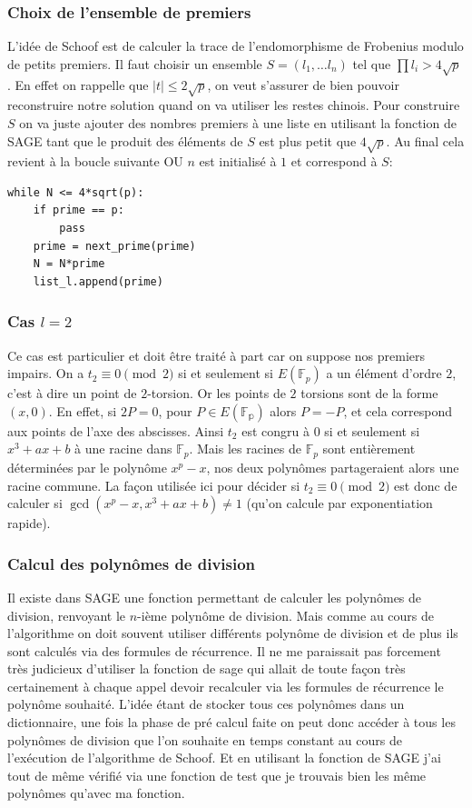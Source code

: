\documentclass[12pt]{article}
\begin{document}
\subsubsection{Choix de l'ensemble de premiers}
L'idée de Schoof est de calculer la trace de l'endomorphisme de Frobenius modulo de petits premiers. Il faut choisir un ensemble $S = (l_1, \ldots l_n)$ tel que $\prod l_i > 4\sqrt{p}$. En effet on rappelle que  $|t| \leq 2 \sqrt{p}$, on veut s'assurer de bien pouvoir reconstruire notre solution quand on va utiliser les restes chinois. Pour construire $S$ on va juste ajouter des nombres premiers à une liste en utilisant la fonction  de SAGE tant que le produit des éléments de $S$ est plus petit que $ 4\sqrt{p}$. Au final cela revient à la boucle suivante OU $n$ est initialisé à $1$ et  correspond à $S$:
\bigskip

\begin{lstlisting}
while N <= 4*sqrt(p):
	if prime == p:
		pass
	prime = next_prime(prime)
	N = N*prime
	list_l.append(prime)
\end{lstlisting}


\subsubsection{Cas $l=2$}
Ce cas est particulier et doit être traité à part car on suppose nos premiers impairs. On a $t_2 \equiv 0 \pmod 2$ si et seulement si $E(\mathbb{F}_p)$ a un élément d'ordre $2$, c'est à dire un point de $2$-torsion. Or les points de $2$ torsions sont de la forme $(x, 0)$. En effet, si $2P = 0$, pour $P \in E(\mathbb{F_p})$ alors $P = -P$, et cela correspond aux points de l'axe des abscisses. Ainsi $t_2$ est congru à $0$ si et seulement si $x^3 +ax +b$ à une racine dans $\mathbb{F}_p$. Mais les racines de $\mathbb{F}_p$ sont entièrement déterminées par le polynôme $x^p - x$, nos deux polynômes partageraient alors une racine commune. La façon utilisée ici pour décider si $t_2 \equiv 0 \pmod 2$ est donc de calculer si $\gcd(x^p - x, x^3 +ax +b) \ne 1$ (qu'on calcule par exponentiation rapide).

\subsubsection{Calcul des polynômes de division}
Il existe dans SAGE une fonction permettant de calculer les polynômes de division,  renvoyant le $n$-ième polynôme de division. Mais comme au cours de l'algorithme on doit souvent utiliser différents polynôme de division et de plus ils sont calculés via des formules de récurrence. Il ne me paraissait pas forcement très judicieux d'utiliser la fonction de sage qui allait de toute façon très certainement à chaque appel devoir recalculer via les formules de récurrence le polynôme souhaité. L'idée étant de stocker tous ces polynômes dans un dictionnaire, une fois la phase de pré calcul faite on peut donc accéder à tous les polynômes de division que l'on souhaite en temps constant au cours de l'exécution de l'algorithme de Schoof. Et en utilisant la fonction de SAGE j'ai tout de même vérifié via une fonction de test que je trouvais bien les même polynômes qu'avec ma fonction.
\end{document}
